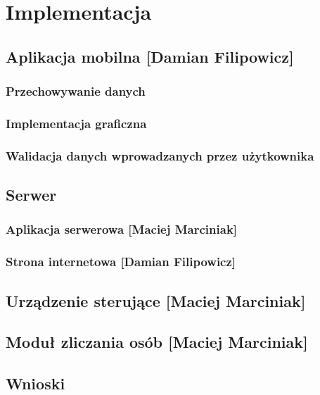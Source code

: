 \newpage\section{Implementacja} \label{sec:implementacja}
\subsection[Aplikacja mobilna]{Aplikacja mobilna [Damian Filipowicz]}
	\subsubsection{Przechowywanie danych}
	\subsubsection{Implementacja graficzna}
	\subsubsection{Walidacja danych wprowadzanych przez użytkownika}

\newpage
\subsection{Serwer}
	\subsubsection[Aplikacja serwerowa]{Aplikacja serwerowa [Maciej Marciniak]}
	\subsubsection[Strona internetowa]{Strona internetowa [Damian Filipowicz]}
\newpage
\subsection[Urządzenie sterujące]{Urządzenie sterujące [Maciej Marciniak]}

\newpage
\subsection[Moduł zliczania osób]{Moduł zliczania osób [Maciej Marciniak]}

\newpage
\subsection{Wnioski}




 
